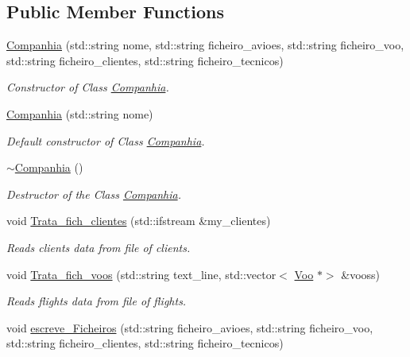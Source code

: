 \subsection*{Public Member Functions}
\begin{DoxyCompactItemize}
\item 
\hyperlink{class_companhia_a60e3a82ec9cab11dda8561eace88c92e}{Companhia} (std\+::string nome, std\+::string ficheiro\+\_\+avioes, std\+::string ficheiro\+\_\+voo, std\+::string ficheiro\+\_\+clientes, std\+::string ficheiro\+\_\+tecnicos)
\begin{DoxyCompactList}\small\item\em Constructor of Class \hyperlink{class_companhia}{Companhia}. \end{DoxyCompactList}\item 
\hyperlink{class_companhia_a4e9b97a66c64839b1903b4e45a8c7cda}{Companhia} (std\+::string nome)
\begin{DoxyCompactList}\small\item\em Default constructor of Class \hyperlink{class_companhia}{Companhia}. \end{DoxyCompactList}\item 
\hyperlink{class_companhia_ac8d787355ae09623101260f59e7255cc}{$\sim$\+Companhia} ()
\begin{DoxyCompactList}\small\item\em Destructor of the Class \hyperlink{class_companhia}{Companhia}. \end{DoxyCompactList}\item 
void \hyperlink{class_companhia_a32eb5b0d264cb8442524c9bef66191ad}{Trata\+\_\+fich\+\_\+clientes} (std\+::ifstream \&my\+\_\+clientes)
\begin{DoxyCompactList}\small\item\em Reads clients data from file of clients. \end{DoxyCompactList}\item 
void \hyperlink{class_companhia_ab2cbb2348e264b650de42f0cc1b0abd2}{Trata\+\_\+fich\+\_\+voos} (std\+::string text\+\_\+line, std\+::vector$<$ \hyperlink{class_voo}{Voo} $\ast$$>$ \&vooss)
\begin{DoxyCompactList}\small\item\em Reads flights data from file of flights. \end{DoxyCompactList}\item 
void \hyperlink{class_companhia_a04bb39107602deacf67a4667887cf562}{escreve\+\_\+\+Ficheiros} (std\+::string ficheiro\+\_\+avioes, std\+::string ficheiro\+\_\+voo, std\+::string ficheiro\+\_\+clientes, std\+::string ficheiro\+\_\+tecnicos)
$$
\end{DoxyCompactItemize}
